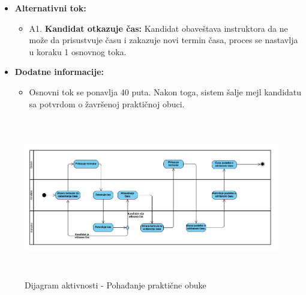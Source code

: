 \begin{itemize}
\item \textbf{Alternativni tok:}  
   \begin{itemize}
   \item A1. \textbf{Kandidat otkazuje čas:}
  Kandidat obaveštava instruktora da ne može da prisustvuje času i zakazuje novi termin časa, proces se nastavlja u koraku 1 osnovnog toka.
   \end{itemize}

\item \textbf{Dodatne informacije:}    
\begin{itemize}
\item Osnovni tok se ponavlja 40 puta. Nakon toga, sistem šalje mejl kandidatu sa potvrdom o žavršenoj praktičnoj obuci.
\end{itemize}

\end{itemize}

\begin{figure}[H]
  \begin{center}
      \includegraphics[width=170mm, height=70mm]{Diagrams/dijagram_aktivnosti_pohadjanje_prakticne_obuke.png}
  \end{center}
  \caption {Dijagram aktivnosti - Pohađanje praktične obuke}
  \label{activity_pohadjanje_prakticne_obuke}

\end{figure}
